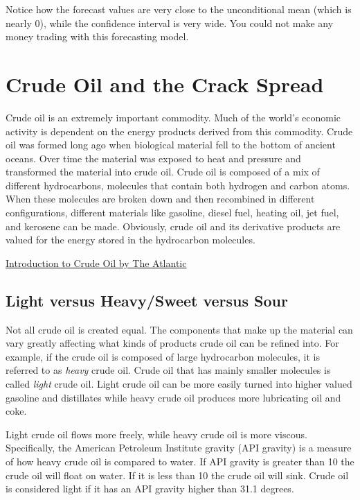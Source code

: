 \documentclass[
]{book}
\begin{document}
Notice how the forecast values are very close to the unconditional mean (which is nearly 0), while the confidence interval is very wide. You could not make any money trading with this forecasting model.

\hypertarget{crude-oil-and-the-crack-spread}{%
\chapter{Crude Oil and the Crack Spread}\label{crude-oil-and-the-crack-spread}}

Crude oil is an extremely important commodity. Much of the world's economic activity is dependent on the energy products derived from this commodity. Crude oil was formed long ago when biological material fell to the bottom of ancient oceans. Over time the material was exposed to heat and pressure and transformed the material into crude oil. Crude oil is composed of a mix of different hydrocarbons, molecules that contain both hydrogen and carbon atoms. When these molecules are broken down and then recombined in different configurations, different materials like gasoline, diesel fuel, heating oil, jet fuel, and kerosene can be made. Obviously, crude oil and its derivative products are valued for the energy stored in the hydrocarbon molecules.

\href{https://www.youtube.com/watch?v=62LvVYYqUFA}{Introduction to Crude Oil by The Atlantic}

\hypertarget{light-versus-heavysweet-versus-sour}{%
\section{Light versus Heavy/Sweet versus Sour}\label{light-versus-heavysweet-versus-sour}}

Not all crude oil is created equal. The components that make up the material can vary greatly affecting what kinds of products crude oil can be refined into. For example, if the crude oil is composed of large hydrocarbon molecules, it is referred to as \emph{heavy} crude oil. Crude oil that has mainly smaller molecules is called \emph{light} crude oil. Light crude oil can be more easily turned into higher valued gasoline and distillates while heavy crude oil produces more lubricating oil and coke.

Light crude oil flows more freely, while heavy crude oil is more viscous. Specifically, the American Petroleum Institute gravity (API gravity) is a measure of how heavy crude oil is compared to water. If API gravity is greater than 10 the crude oil will float on water. If it is less than 10 the crude oil will sink. Crude oil is considered light if it has an API gravity higher than 31.1 degrees.
\end{document}
